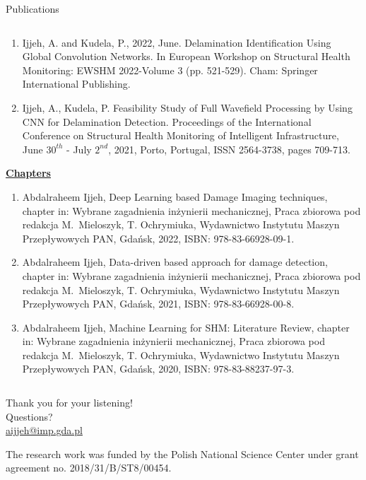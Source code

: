 \documentclass[10pt,aspectratio=169,dvipsnames]{beamer} %
\begin{document}
\begin{frame}{Publications}
\begin{tiny}
\begin{columns}[T]
\begin{column}[t]{0.48\textwidth}
\begin{enumerate}
						\item Ijjeh, A. and Kudela, P., 2022, June. Delamination Identification Using Global Convolution Networks. 
						In European Workshop on Structural Health Monitoring: EWSHM 2022-Volume 3 (pp. 521-529). Cham: Springer International Publishing.		
						\item {Ijjeh, A.}, Kudela, P. Feasibility Study of Full Wavefield Processing by Using CNN for Delamination Detection. 
						Proceedings of the International Conference on Structural Health Monitoring of Intelligent
						Infrastructure, June \(30^{th}\) - July \(2^{nd}\), 2021, Porto, Portugal, ISSN 2564-3738, pages 709-713.
					\end{enumerate}		
					\underline{\textbf{Chapters}}					
					\begin{enumerate}
						\justifying
						\item {Abdalraheem Ijjeh}, Deep Learning based Damage Imaging techniques, chapter in: Wybrane zagadnienia
						inżynierii mechanicznej, Praca zbiorowa pod redakcja M.~Mieloszyk, T. Ochrymiuka, Wydawnictwo Instytutu
						Maszyn Przepływowych PAN, Gdańsk, 2022, ISBN: 978-83-66928-09-1.
						\item {Abdalraheem Ijjeh}, Data-driven based approach for damage detection, chapter in: Wybrane zagadnienia
						inżynierii mechanicznej, Praca zbiorowa pod redakcja M.~Mieloszyk, T. Ochrymiuka, Wydawnictwo Instytutu
						Maszyn Przepływowych PAN, Gdańsk, 2021, ISBN: 978-83-66928-00-8.				
						\item {Abdalraheem Ijjeh}, Machine Learning for SHM: Literature Review, chapter in: Wybrane zagadnienia
						inżynierii mechanicznej, Praca zbiorowa pod redakcja M.~Mieloszyk, T. Ochrymiuka, Wydawnictwo Instytutu
						Maszyn Przepływowych PAN, Gdańsk, 2020, ISBN: 978-83-88237-97-3.
					\end{enumerate}
				\end{column}		
			\end{columns}
		\end{tiny}
	\end{frame}	
	\note{}	
	\setcounter{subfigure}{0}
	{
		\begin{frame}[standout]
			Thank you for your listening!\\ \vspace{12pt}
			Questions?\\ \vspace{12pt}
			\url{aijjeh@imp.gda.pl}
			\par\medskip
			\par\medskip
			\footnotesize
			The research work was funded by the Polish National Science Center under grant agreement no. 2018/31/B/ST8/00454.
		\end{frame}
	}
	\note{}	
	
\end{document}
